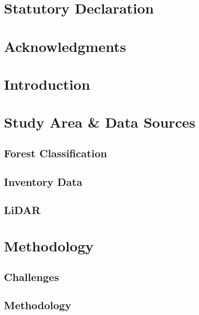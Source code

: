 \documentclass[12pt]{article}
\numberwithin{equation}{section}
\numberwithin{table}{section}
\numberwithin{figure}{section}
\begin{document}
\thispagestyle{empty}	

\newpage
\null\thispagestyle{empty}
\newpage
\thispagestyle{empty}
\section*{Statutory Declaration}

\newpage
\null\thispagestyle{empty}
\newpage
\thispagestyle{empty}
\section*{Acknowledgments}

\newpage
\null\thispagestyle{empty}
\newpage


	
\thispagestyle{empty}
\tableofcontents
\newpage




\newpage

\setcounter{page}{1} 

\section{Introduction}

\clearpage
\section{Study Area \& Data Sources}
\subsection{Forest Classification}

\subsection{Inventory Data} \label{Inventory Data}

\subsection{LiDAR} \label{LiDAR}

\clearpage
\section{Methodology}
\subsection{Challenges} \label{Challenges}

\subsection{Methodology} \label{Methodology}

\clearpage
\end{document}

